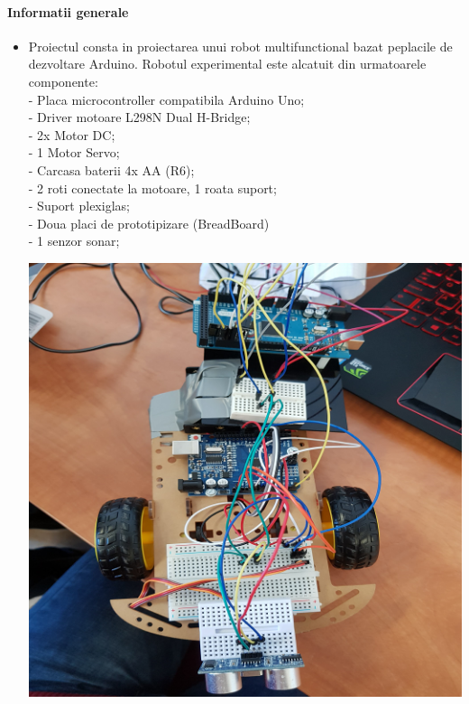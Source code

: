 \newcommand\tab[1][1cm]{\hspace*{#1}}
\graphicspath{ {images/} }
\paragraph{Informatii generale}
\begin{itemize}
\item


	\tab Proiectul consta in proiectarea unui robot multifunctional bazat peplacile de dezvoltare Arduino. Robotul experimental este alcatuit din urmatoarele componente:\\
-	Placa microcontroller compatibila Arduino Uno;\\
-	Driver motoare L298N Dual H-Bridge;\\
-	2x Motor DC;\\
-	1 Motor Servo;\\
-	Carcasa baterii 4x AA (R6);\\
-	2 roti conectate la motoare, 1 roata suport;\\
-	Suport plexiglas;\\
-	Doua placi de prototipizare (BreadBoard)\\
-	1 senzor sonar;\\

	\begin{center}
	\includegraphics[scale=0.5]{robo22.png}\\
	\end{center}
\end{itemize}


